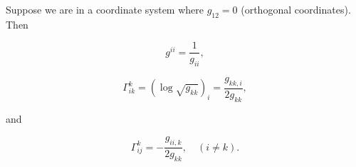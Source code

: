 Suppose we are in a coordinate system where $g_{12} = 0$ (orthogonal coordinates). Then

$$g^{ii} = \frac{1}{g_{ii}},$$

$$\Gamma_{ik}^k = (\log \sqrt{g_{kk}})_i = \frac{g_{kk,i}}{2g_{kk}},$$

and

$$\Gamma_{ij}^k = -\frac{g_{ii,k}}{2g_{kk}}, \quad (i \neq k).$$
